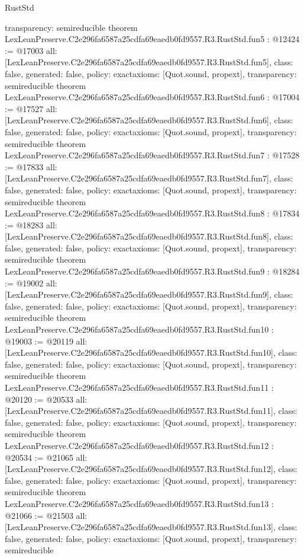 \begin{lexlean}{RustStd}
\begin{coremodule}
{  transparency: semireducible
}
theorem LexLeanPreserve.C2e296fa6587a25cdfa69eaedb0fd9557.R3.RustStd.fun5 : @12424 := @17003 {
  all: [LexLeanPreserve.C2e296fa6587a25cdfa69eaedb0fd9557.R3.RustStd.fun5],
  class: false,
  generated: false,
  policy: exact{axioms: [Quot.sound, propext]},
  transparency: semireducible
}
theorem LexLeanPreserve.C2e296fa6587a25cdfa69eaedb0fd9557.R3.RustStd.fun6 : @17004 := @17527 {
  all: [LexLeanPreserve.C2e296fa6587a25cdfa69eaedb0fd9557.R3.RustStd.fun6],
  class: false,
  generated: false,
  policy: exact{axioms: [Quot.sound, propext]},
  transparency: semireducible
}
theorem LexLeanPreserve.C2e296fa6587a25cdfa69eaedb0fd9557.R3.RustStd.fun7 : @17528 := @17833 {
  all: [LexLeanPreserve.C2e296fa6587a25cdfa69eaedb0fd9557.R3.RustStd.fun7],
  class: false,
  generated: false,
  policy: exact{axioms: [Quot.sound, propext]},
  transparency: semireducible
}
theorem LexLeanPreserve.C2e296fa6587a25cdfa69eaedb0fd9557.R3.RustStd.fun8 : @17834 := @18283 {
  all: [LexLeanPreserve.C2e296fa6587a25cdfa69eaedb0fd9557.R3.RustStd.fun8],
  class: false,
  generated: false,
  policy: exact{axioms: [Quot.sound, propext]},
  transparency: semireducible
}
theorem LexLeanPreserve.C2e296fa6587a25cdfa69eaedb0fd9557.R3.RustStd.fun9 : @18284 := @19002 {
  all: [LexLeanPreserve.C2e296fa6587a25cdfa69eaedb0fd9557.R3.RustStd.fun9],
  class: false,
  generated: false,
  policy: exact{axioms: [Quot.sound, propext]},
  transparency: semireducible
}
theorem LexLeanPreserve.C2e296fa6587a25cdfa69eaedb0fd9557.R3.RustStd.fun10 : @19003 := @20119 {
  all: [LexLeanPreserve.C2e296fa6587a25cdfa69eaedb0fd9557.R3.RustStd.fun10],
  class: false,
  generated: false,
  policy: exact{axioms: [Quot.sound, propext]},
  transparency: semireducible
}
theorem LexLeanPreserve.C2e296fa6587a25cdfa69eaedb0fd9557.R3.RustStd.fun11 : @20120 := @20533 {
  all: [LexLeanPreserve.C2e296fa6587a25cdfa69eaedb0fd9557.R3.RustStd.fun11],
  class: false,
  generated: false,
  policy: exact{axioms: [Quot.sound, propext]},
  transparency: semireducible
}
theorem LexLeanPreserve.C2e296fa6587a25cdfa69eaedb0fd9557.R3.RustStd.fun12 : @20534 := @21065 {
  all: [LexLeanPreserve.C2e296fa6587a25cdfa69eaedb0fd9557.R3.RustStd.fun12],
  class: false,
  generated: false,
  policy: exact{axioms: [Quot.sound, propext]},
  transparency: semireducible
}
theorem LexLeanPreserve.C2e296fa6587a25cdfa69eaedb0fd9557.R3.RustStd.fun13 : @21066 := @21503 {
  all: [LexLeanPreserve.C2e296fa6587a25cdfa69eaedb0fd9557.R3.RustStd.fun13],
  class: false,
  generated: false,
  policy: exact{axioms: [Quot.sound, propext]},
  transparency: semireducible
}
\end{coremodule}
\end{lexlean}
